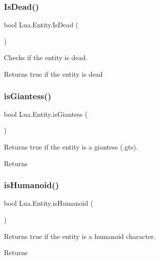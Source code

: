 \subsubsection{\texorpdfstring{IsDead()}{IsDead()}}
{\footnotesize\ttfamily bool Lua.\+Entity.\+Is\+Dead (\begin{DoxyParamCaption}{ }\end{DoxyParamCaption})}



Checks if the entity is dead. 

\begin{DoxyReturn}{Returns}
true if the entity is dead
\end{DoxyReturn}
\mbox{\label{class_lua_1_1_entity_af72e042e1fd05c66abceebb49ec2caf4}} 
\subsubsection{\texorpdfstring{isGiantess()}{isGiantess()}}
{\footnotesize\ttfamily bool Lua.\+Entity.\+is\+Giantess (\begin{DoxyParamCaption}{ }\end{DoxyParamCaption})}



Returns true if the entity is a giantess (.gts). 

\begin{DoxyReturn}{Returns}

\end{DoxyReturn}
\mbox{\label{class_lua_1_1_entity_a27a8d5461e9d6890e085b06e2d00f6bd}} 
\subsubsection{\texorpdfstring{isHumanoid()}{isHumanoid()}}
{\footnotesize\ttfamily bool Lua.\+Entity.\+is\+Humanoid (\begin{DoxyParamCaption}{ }\end{DoxyParamCaption})}



Returns true if the entity is a humanoid character. 

\begin{DoxyReturn}{Returns}

\end{DoxyReturn}
\mbox{\label{class_lua_1_1_entity_a5eaa128b6b8cf4aeb7f219edd030d61e}} 
